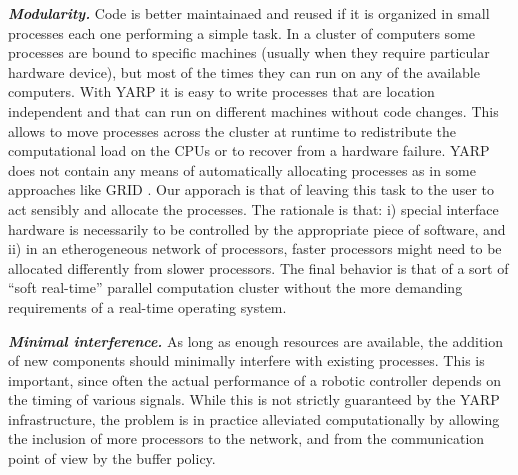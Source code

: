 \textit{\textbf{Modularity.}}
Code is better maintainaed and reused if it is organized in small processes 
each one performing a simple task. In a cluster of computers some processes 
are bound to specific machines (usually when they require particular hardware 
device), but most of the times they can run on any of the available computers. 
With YARP it is easy to write processes that are location independent and 
that can run on different machines without code changes. This allows to move 
processes across the cluster at runtime to redistribute the computational 
load on the CPUs or to recover from a hardware failure. 
YARP does not contain any means of automatically allocating processes as in 
some approaches like GRID \cite{grid}. Our apporach is that of leaving this
task to the user to act sensibly and allocate the processes. The rationale is that: i)
special interface hardware is necessarily to be controlled by the appropriate piece of 
software, and ii) in an etherogeneous network of processors, faster processors might 
need to be allocated differently from slower processors. The final behavior is that of 
a sort of ``soft real-time'' parallel computation cluster without the more demanding
requirements of a real-time operating system.

\textit{\textbf{Minimal interference.}}
As long as enough resources are available, the addition of new components 
should minimally interfere with existing processes. This is important, since often 
the actual performance of a robotic controller depends on the timing of various signals. 
While this is not strictly guaranteed by the YARP infrastructure, the problem is in 
practice alleviated computationally by allowing the inclusion of more processors to 
the network, and from the communication point of view by the buffer policy.

